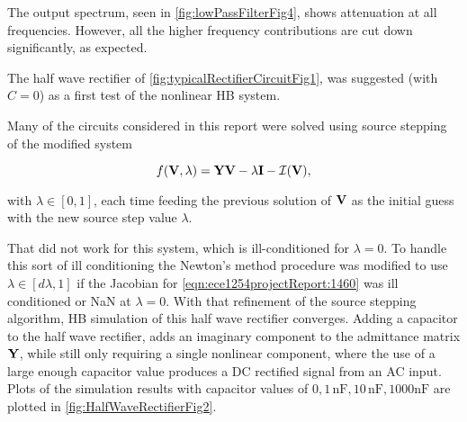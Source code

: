 The output spectrum, seen in \cref{fig:lowPassFilterFig4},
shows attenuation at all frequencies.
However, all the higher frequency contributions are cut down significantly, as expected.



The half wave rectifier of \cref{fig:typicalRectifierCircuitFig1}, was suggested (with \( C = 0 \)) as a first test of the nonlinear HB system.


Many of the circuits considered in this report were solved using source stepping of the modified system

\begin{equation}\label{eqn:ece1254projectReport:1460}
f(\BV, \lambda) = \BY \BV - \lambda \BI - \calI(\BV),
\end{equation}

with \( \lambda \in [0, 1] \), each time feeding the previous solution of \( \mathbf{V} \) as the initial guess with the new source step value \( \lambda \).

That did not work for this system, which is ill-conditioned for \( \lambda = 0 \).
To handle this sort of ill conditioning the Newton's method procedure was modified to use \( \lambda \in [d\lambda, 1] \) if the Jacobian for \cref{eqn:ece1254projectReport:1460} was ill conditioned or NaN at \( \lambda = 0 \).
With that refinement of the source stepping algorithm, HB simulation of this half wave rectifier converges.
Adding a capacitor to the half wave rectifier, adds an imaginary component to the admittance matrix \( \mathbf{Y} \), while still only requiring a single nonlinear component, where the use of a large enough capacitor value produces a DC rectified signal from an AC input.
Plots of the simulation results with
capacitor values of \( 0, 1 \, \text{nF}, 10 \, \text{nF}, 1000 \text{nF} \) are plotted in \cref{fig:HalfWaveRectifierFig2}.


